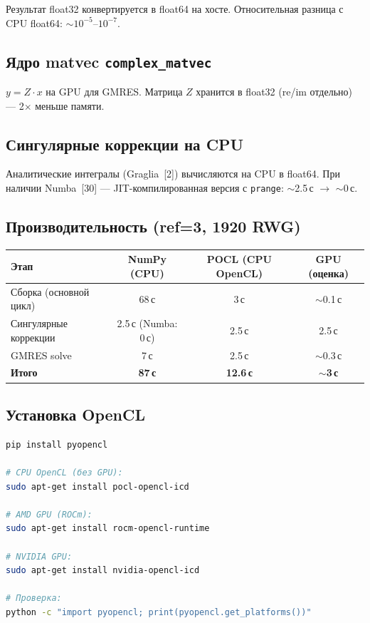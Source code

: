 \documentclass[12pt,a4paper]{article}
\begin{document}
Результат float32 конвертируется в float64 на хосте. Относительная разница с CPU float64: $\sim 10^{-5}$--$10^{-7}$.

\subsection{Ядро matvec \texttt{complex\_matvec}}

$y = Z \cdot x$ на GPU для GMRES. Матрица $Z$ хранится в float32 (re/im отдельно) --- 2$\times$ меньше памяти.

\subsection{Сингулярные коррекции на CPU}

Аналитические интегралы (Graglia~[2]) вычисляются на CPU в float64. При наличии Numba~[30] --- JIT-компилированная версия с \texttt{prange}: $\sim$2.5\,с $\to$ $\sim$0\,с.

\subsection{Производительность (ref=3, 1920 RWG)}

\begin{center}
\begin{tabular}{lccc}
\toprule
Этап & NumPy (CPU) & POCL (CPU OpenCL) & GPU (оценка) \\
\midrule
Сборка (основной цикл) & 68\,с & 3\,с & $\sim$0.1\,с \\
Сингулярные коррекции & 2.5\,с (Numba: 0\,с) & 2.5\,с & 2.5\,с \\
GMRES solve & 7\,с & 2.5\,с & $\sim$0.3\,с \\
\textbf{Итого} & \textbf{87\,с} & \textbf{12.6\,с} & \textbf{$\sim$3\,с} \\
\bottomrule
\end{tabular}
\end{center}

\subsection{Установка OpenCL}

\begin{lstlisting}[language=bash]
pip install pyopencl

# CPU OpenCL (без GPU):
sudo apt-get install pocl-opencl-icd

# AMD GPU (ROCm):
sudo apt-get install rocm-opencl-runtime

# NVIDIA GPU:
sudo apt-get install nvidia-opencl-icd

# Проверка:
python -c "import pyopencl; print(pyopencl.get_platforms())"
\end{lstlisting}
\end{document}
